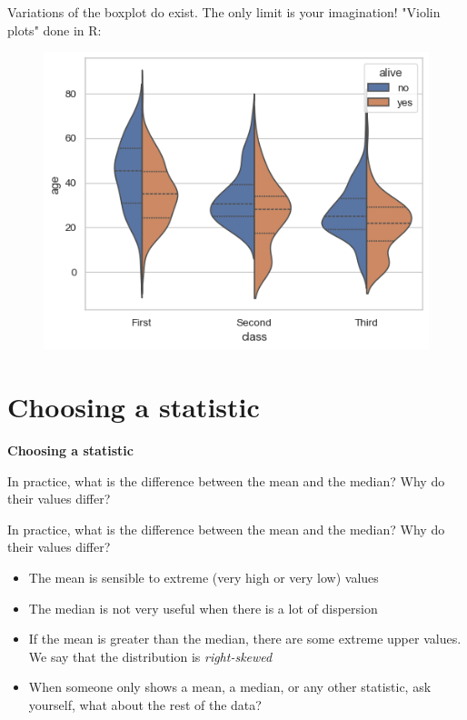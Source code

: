 \documentclass[compress]{beamer}
\begin{document}
\begin{frame}
	Variations of the boxplot do exist. The only limit is your imagination! "Violin plots" done in R:
	\begin{figure}
		\centering
		\includegraphics[scale=0.6]{Picture/violin titanic.png}
	\end{figure}
\end{frame}

\section{Choosing a statistic}
\begin{frame}[plain]
    \centering \Large
    \textbf{Choosing a statistic}
\end{frame}

\begin{frame}
	In practice, what is the difference between the mean and the median? Why do their values differ?
\end{frame}

\begin{frame}
	In practice, what is the difference between the mean and the median? Why do their values differ?
	\vspace{0.2cm}
	\begin{itemize}
		\item The mean is sensible to extreme (very high or very low) values
		\item The median is not very useful when there is a lot of dispersion
		\item If the mean is greater than the median, there are some extreme upper values. We say that the distribution is \textit{right-skewed}
		\item When someone only shows a mean, a median, or any other statistic, ask yourself, what about the rest of the data?
	\end{itemize}
\end{frame}
\end{document}
